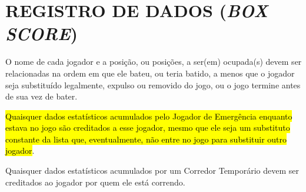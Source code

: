 \section{REGISTRO DE DADOS (\textit{BOX SCORE})}

		O nome de cada jogador e a posição, ou posições, a ser(em) ocupada(s) devem ser relacionadas na ordem em que ele bateu, ou teria batido, a menos que o jogador seja substituído legalmente, expulso ou removido do jogo, ou o jogo termine antes de sua vez de bater.

		\hl{Quaisquer dados estat\'isticos acumulados pelo Jogador de Emerg\^encia enquanto estava no jogo s\~ao creditados a esse jogador, mesmo que ele seja um substituto constante da lista que, eventualmente, n\~ao entre no jogo para substituir outro jogador}.

		Quaisquer dados estatísticos acumulados por um Corredor Temporário devem ser creditados ao jogador por quem ele está correndo.

